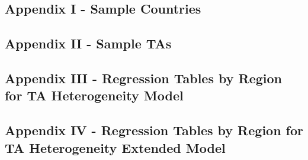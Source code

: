 \subsection{Appendix I {-} Sample Countries}%
\label{subsec:AppendixI{-}SampleCountries}%


%
\subsection{Appendix II {-} Sample TAs}%
\label{subsec:AppendixII{-}SampleTAs}%


%
\subsection{Appendix III {-} Regression Tables by Region for TA Heterogeneity Model}%
\label{subsec:AppendixIII{-}RegressionTablesbyRegionforTAHeterogeneityModel}%
\FloatBarrier%
%
\FloatBarrier%
%
\FloatBarrier%
%
\FloatBarrier%
%
\FloatBarrier%
%
\FloatBarrier

%
\subsection{Appendix IV {-} Regression Tables by Region for TA Heterogeneity Extended Model}%
\label{subsec:AppendixIV{-}RegressionTablesbyRegionforTAHeterogeneityExtendedModel}%
\FloatBarrier%
%
\FloatBarrier%
%
\FloatBarrier%
%
\FloatBarrier%
%
\FloatBarrier%
%
\FloatBarrier

%
